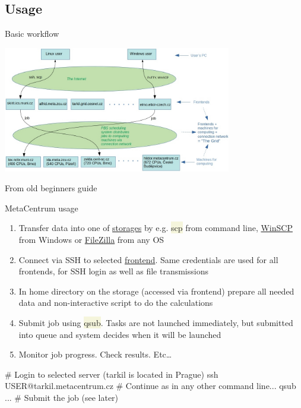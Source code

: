 \documentclass[compress, xelatex, 11pt, xcolor=svgnames, aspectratio=169,
	hyperref={
		bookmarks=true,
		unicode=true,
		colorlinks=true,
		pdftitle={Linux, command line and MetaCentrum},
		plainpages=false,
		pdfauthor={Vojtech Zeisek},
		pdfsubject={Course about use of Linux command line, writing shell scripts and using MetaCentrum of CESNET},
		pdfcreator={XeLaTeX},
		pdfkeywords={Linux, GNU, BASH, shell, command line, MetaCentrum},
		linkcolor=DarkRed, %
		anchorcolor=DarkBlue, %
		citecolor=Indigo, %
		filecolor=NavyBlue, %
		menucolor=DarkMagenta, %
		urlcolor=DarkBlue, %
		},
	url={hyphens, lowtilde} %
	]{beamer}
\renewcommand{\texttt}[1]{\colorbox{Beige}{{\ttfamily #1}}}
\begin{document}
\subsection{Usage}

\begin{frame}{Basic workflow}
	\begin{center}
		\includegraphics[height=5.5cm]{grid_graphics.jpg}
	\end{center}
	\begin{flushright}
		From old beginners guide
	\end{flushright}
\end{frame}

\begin{frame}[fragile]{MetaCentrum usage}
	\begin{enumerate}
		\item Transfer data into one of \href{https://docs.metacentrum.cz/data/useful-commands/}{storages} by e.g. \texttt{scp} from command line, \href{https://winscp.net/}{WinSCP} from Windows or \href{https://filezilla-project.org/}{FileZilla} from any OS
		\item Connect via SSH to selected \href{https://docs.metacentrum.cz/computing/infrastructure/frontends/}{frontend}. Same credentials are used for all frontends, for SSH login as well as file transmissions
		\item In home directory on the storage (accessed via frontend) prepare all needed data and non-interactive script to do the calculations
		\item Submit job using \texttt{qsub}. Tasks are not launched immediately, but submitted into queue and system decides when it will be launched
		\item Monitor job progress. Check results. Etc\ldots
	\end{enumerate}
	\begin{bashcode}
    # Login to selected server (tarkil is located in Prague)
    ssh USER@tarkil.metacentrum.cz
    # Continue as in any other command line...
    qsub ... # Submit the job (see later)
	\end{bashcode}
\end{frame}
\end{document}
